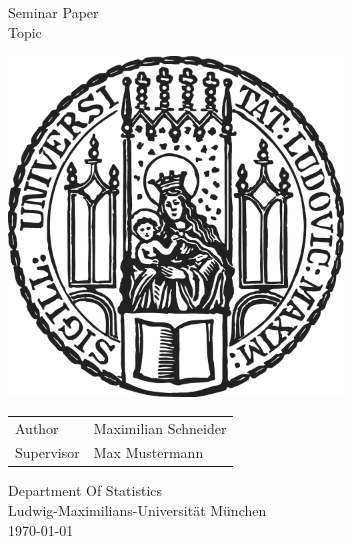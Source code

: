 \begin{titlepage}
\centering
\Huge

Seminar Paper \\
Topic

\vspace{2cm}
\includegraphics[width=0.666\textwidth]{Figures/Sigillum.png} \\
\vspace{2cm}

\begin{tabular}{ll}
Author & Maximilian Schneider \\
Supervisor & Max Mustermann \\
\end{tabular}
\vspace{1cm}

Department Of Statistics \\
Ludwig-Maximilians-Universität München \\
\today

\end{titlepage}
